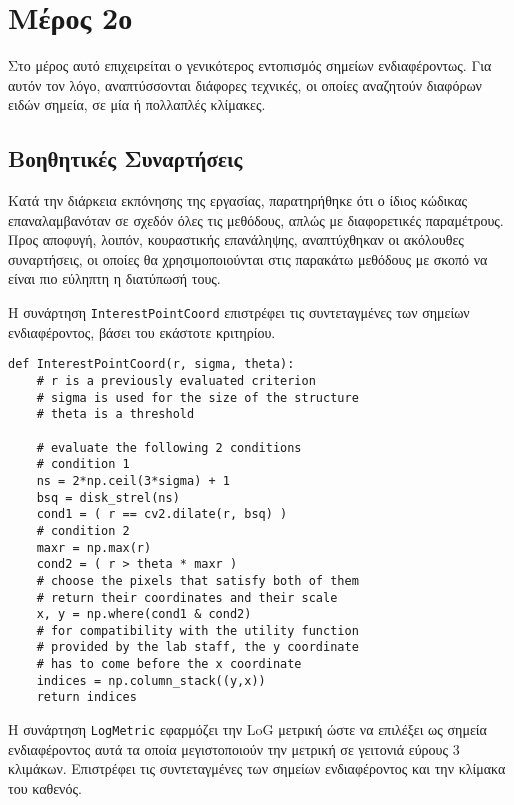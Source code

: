 \documentclass{article}
\newcommand{\eng}[1]{\foreignlanguage{english}{#1}}
\begin{document}
\section{Μέρος 2ο}

Στο μέρος αυτό επιχειρείται ο γενικότερος εντοπισμός σημείων ενδιαφέροντως. Για αυτόν τον λόγο, αναπτύσσονται διάφορες τεχνικές, οι οποίες αναζητούν διαφόρων ειδών σημεία, σε μία ή πολλαπλές κλίμακες.

\subsection{Βοηθητικές Συναρτήσεις}

Κατά την διάρκεια εκπόνησης της εργασίας, παρατηρήθηκε ότι ο ίδιος κώδικας επαναλαμβανόταν σε σχεδόν όλες τις μεθόδους, απλώς με διαφορετικές παραμέτρους. Προς αποφυγή, λοιπόν, κουραστικής επανάληψης, αναπτύχθηκαν οι ακόλουθες συναρτήσεις, οι οποίες θα χρησιμοποιούνται στις παρακάτω μεθόδους με σκοπό να είναι πιο εύληπτη η διατύπωσή τους.

Η συνάρτηση \eng{\texttt{InterestPointCoord}} επιστρέφει τις συντεταγμένες των σημείων ενδιαφέροντος, βάσει του εκάστοτε κριτηρίου.

\begin{lstlisting}[breaklines=true, showstringspaces=false]
def InterestPointCoord(r, sigma, theta):
    # r is a previously evaluated criterion
    # sigma is used for the size of the structure
    # theta is a threshold

    # evaluate the following 2 conditions
    # condition 1
    ns = 2*np.ceil(3*sigma) + 1
    bsq = disk_strel(ns)
    cond1 = ( r == cv2.dilate(r, bsq) )
    # condition 2
    maxr = np.max(r)
    cond2 = ( r > theta * maxr )
    # choose the pixels that satisfy both of them
    # return their coordinates and their scale
    x, y = np.where(cond1 & cond2)
    # for compatibility with the utility function
    # provided by the lab staff, the y coordinate
    # has to come before the x coordinate
    indices = np.column_stack((y,x))
    return indices
\end{lstlisting}

Η συνάρτηση \eng{\texttt{LogMetric}} εφαρμόζει την \eng{LoG} μετρική ώστε να επιλέξει ως σημεία ενδιαφέροντος αυτά τα οποία μεγιστοποιούν την μετρική σε γειτονιά εύρους 3 κλιμάκων. Επιστρέφει τις συντεταγμένες των σημείων ενδιαφέροντος και την κλίμακα του καθενός.
\end{document}

